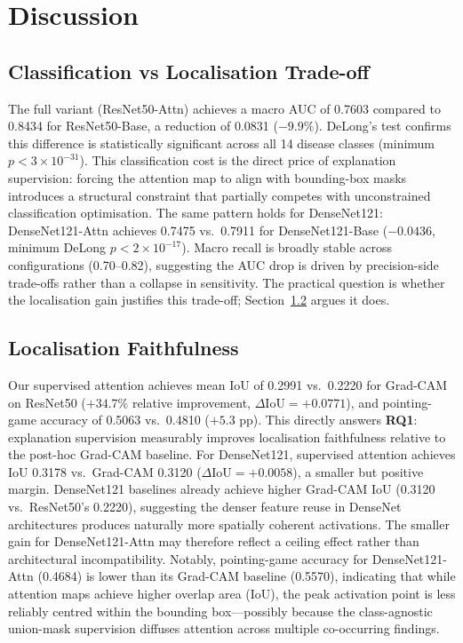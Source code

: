 \documentclass[12pt, a4paper]{article}
\begin{document}
\section{Discussion}

\subsection{Classification vs Localisation Trade-off}

The full variant (ResNet50-Attn) achieves a macro AUC of 0.7603 compared to 0.8434 for
ResNet50-Base, a reduction of 0.0831 ($-9.9\%$). DeLong's test confirms this difference
is statistically significant across all 14 disease classes (minimum $p < 3\times10^{-31}$).
This classification cost is the direct price of explanation supervision: forcing the
attention map to align with bounding-box masks introduces a structural constraint that
partially competes with unconstrained classification optimisation. The same pattern holds
for DenseNet121: DenseNet121-Attn achieves 0.7475 vs.\ 0.7911 for DenseNet121-Base
($-0.0436$, minimum DeLong $p < 2\times10^{-17}$). Macro recall is broadly stable across
configurations (0.70--0.82), suggesting the AUC drop is driven by precision-side
trade-offs rather than a collapse in sensitivity. The practical question is whether the
localisation gain justifies this trade-off; Section~\ref{sec:loc_faith} argues it does.

\subsection{Localisation Faithfulness}
\label{sec:loc_faith}

Our supervised attention achieves mean IoU of 0.2991 vs.\ 0.2220 for Grad-CAM on
ResNet50 ($+34.7\%$ relative improvement, $\Delta\text{IoU} = +0.0771$), and
pointing-game accuracy of 0.5063 vs.\ 0.4810 ($+5.3$ pp). This directly answers
\textbf{RQ1}: explanation supervision measurably improves localisation faithfulness
relative to the post-hoc Grad-CAM baseline. For DenseNet121, supervised attention achieves
IoU 0.3178 vs.\ Grad-CAM 0.3120 ($\Delta\text{IoU} = +0.0058$), a smaller but positive
margin. DenseNet121 baselines already achieve higher Grad-CAM IoU (0.3120 vs.\ ResNet50's
0.2220), suggesting the denser feature reuse in DenseNet architectures produces naturally
more spatially coherent activations. The smaller gain for DenseNet121-Attn may therefore
reflect a ceiling effect rather than architectural incompatibility. Notably,
pointing-game accuracy for DenseNet121-Attn (0.4684) is lower than its Grad-CAM baseline
(0.5570), indicating that while attention maps achieve higher overlap area (IoU), the peak
activation point is less reliably centred within the bounding box---possibly because the
class-agnostic union-mask supervision diffuses attention across multiple co-occurring
findings.
\end{document}
